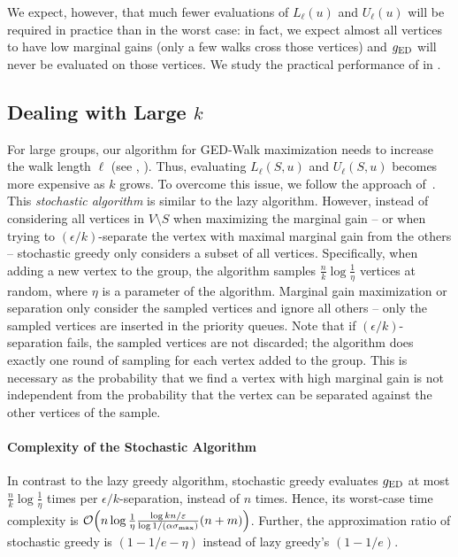 We expect, however, that much fewer evaluations of $L_{\ell}(u)$
and $U_{\ell}(u)$ will be required in practice than in the worst case:
in fact, we expect almost all vertices to have low marginal gains
(\ie only a few walks cross those vertices) and $g_{\text{ED}}$ will never
be evaluated on those vertices.
We study the practical performance of  in
.


\subsection{Dealing with Large $k$}
%
For large groups, our algorithm for GED-Walk maximization needs to increase the
walk length $\ell$ (see ,
). Thus, evaluating $L_{\ell}(S, u)$ and
$U_{\ell}(S, u)$ becomes more expensive as $k$ grows. To overcome this issue,
we follow the approach of~\cite{DBLP:conf/aaai/MirzasoleimanBK15}. This
\emph{stochastic algorithm} is similar to the lazy algorithm. However, instead
of considering all vertices in $V \setminus S$ when maximizing the marginal
gain -- or when trying to $(\epsilon/k)$-separate the vertex with maximal
marginal gain from the others -- stochastic greedy only considers a subset of
all vertices.
%
Specifically, when adding a new vertex to the group, the algorithm samples
$\frac nk \log\frac 1\eta$ vertices at random, where $\eta$ is a parameter of
the algorithm. Marginal gain maximization or separation only consider the
sampled vertices and ignore all others -- \ie only the sampled vertices are
inserted in the priority queues. Note that if $(\epsilon/k)$-separation fails,
the sampled vertices are not discarded; the algorithm does exactly one round of
sampling for each vertex added to the group. This is necessary as the
probability that we find a vertex with high marginal gain is not independent
from the probability that the vertex can be separated against the other
vertices of the sample.

\paragraph{Complexity of the Stochastic Algorithm}
%
In contrast to the lazy greedy algorithm, stochastic greedy evaluates
$g_{\text{ED}}$ at most $\frac nk \log \frac 1\eta$ times per $\epsilon/k$-separation,
instead of $n$ times. Hence, its worst-case time complexity is
$\Oh\roundb{n\log\frac 1\eta \frac{\log kn/\epsilon}{\log 1/ (\alpha\sigma_{\max})}(n + m)}$.
Further, the approximation ratio of stochastic greedy is $(1 - 1/e - \eta)$ instead
of lazy greedy's $(1 - 1/e)$.

